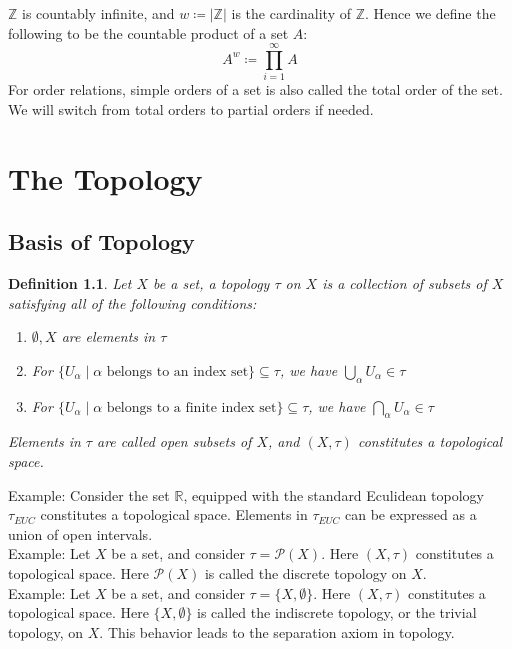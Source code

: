 \documentclass[11pt]{book}
\theoremstyle{break}
\theoremstyle{break}
\newtheorem{defn}{Definition}[corL]
\newcommand{\R}{\mathbb{R}}
\newcommand{\Z}{\mathbb{Z}}
\newcommand{\Power}{\mathcal{P}}
\newcommand{\example}{\color{green}Example: \color{black}}
\begin{document}
$\Z$ is countably infinite, and $w \coloneqq |\Z|$ is the cardinality of $\Z$. Hence we define the following to be the countable product of a set $A$:
$$A^w \coloneqq \prod_{i=1}^\infty A$$
For order relations, simple orders of a set is also called the total order of the set. We will switch from total orders to partial orders if needed. \\


\newpage
\chapter{The Topology}
\section[Basis of Topology]{\color{red}Basis of Topology\color{black}}
\begin{defn}
Let $X$ be a set, a topology $\tau$ on $X$ is a collection of subsets of $X$ satisfying all of the following conditions:
\begin{enumerate}[topsep=3pt,itemsep=-1ex,partopsep=1ex,parsep=1ex]
\item $\emptyset, X$ are elements in $\tau$
\item For $\{ U_\alpha \mid \alpha \text{ belongs to an index set}\}\subseteq \tau$, we have $\bigcup_{\alpha} U_\alpha \in \tau$
\item For $\{ U_\alpha \mid \alpha \text{ belongs to a finite index set}\}\subseteq \tau$, we have $\bigcap_{\alpha} U_\alpha \in \tau$
\end{enumerate} 
Elements in $\tau$ are called open subsets of $X$, and $(X,\tau)$ constitutes a topological space.
\end{defn}

\example Consider the set $\R$, equipped with the standard Eculidean topology $\tau_{EUC}$ constitutes a topological space. Elements in $\tau_{EUC}$ can be expressed as a union of open intervals.\\

\example Let $X$ be a set, and consider $\tau =\Power(X)$. Here $(X,\tau)$ constitutes a topological space. Here $\Power(X)$ is called the discrete topology on $X$.\\

\example Let $X$ be a set, and consider $\tau =\{X,\emptyset\}$. Here $(X,\tau)$ constitutes a topological space. Here $\{X,\emptyset\}$ is called the indiscrete topology, or the trivial topology, on $X$. This behavior leads to the separation axiom in topology.\\
\end{document}
